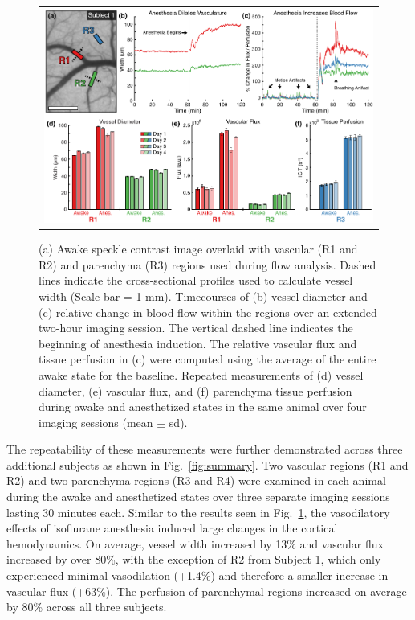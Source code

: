 \documentclass[12pt]{spieman}
\begin{document}
\begin{spacing}{2}
\begin{figure}
    \begin{center}
        \begin{tabular}{c}
            \includegraphics[width=6.25in]{Figure2.pdf}
        \end{tabular}
    \end{center}
    \caption {
        \label{fig:acute}
        (a) Awake speckle contrast image overlaid with vascular (R1 and R2) and parenchyma (R3) regions used during flow analysis. Dashed lines indicate the cross-sectional profiles used to calculate vessel width (Scale bar = 1 mm). Timecourses of (b) vessel diameter and (c) relative change in blood flow within the regions over an extended two-hour imaging session. The vertical dashed line indicates the beginning of anesthesia induction. The relative vascular flux and tissue perfusion in (c) were computed using the average of the entire awake state for the baseline. Repeated measurements of (d) vessel diameter, (e) vascular flux, and (f) parenchyma tissue perfusion during awake and anesthetized states in the same animal over four imaging sessions (mean $\pm$ sd).
    }
\end{figure}

The repeatability of these measurements were further demonstrated across three additional subjects as shown in Fig.~\ref{fig:summary}. Two vascular regions (R1 and R2) and two parenchyma regions (R3 and R4) were examined in each animal during the awake and anesthetized states over three separate imaging sessions lasting 30 minutes each. Similar to the results seen in Fig.~\ref{fig:acute}, the vasodilatory effects of isoflurane anesthesia induced large changes in the cortical hemodynamics. On average, vessel width increased by 13\% and vascular flux increased by over 80\%, with the exception of R2 from Subject 1, which only experienced minimal vasodilation (+1.4\%) and therefore a smaller increase in vascular flux (+63\%). The perfusion of parenchymal regions increased on average by 80\% across all three subjects.


\end{spacing}
\end{document}
